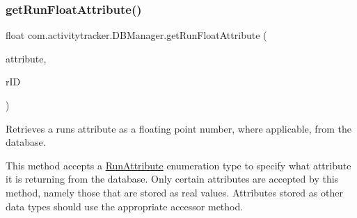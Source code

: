 \subsubsection{\texorpdfstring{get\+Run\+Float\+Attribute()}{getRunFloatAttribute()}}
{\footnotesize\ttfamily float com.\+activitytracker.\+D\+B\+Manager.\+get\+Run\+Float\+Attribute (\begin{DoxyParamCaption}\item[{final \mbox{\hyperlink{enumcom_1_1activitytracker_1_1_run_attribute}{Run\+Attribute}}}]{attribute,  }\item[{final int}]{r\+ID }\end{DoxyParamCaption})}

Retrieves a run\textquotesingle{}s attribute as a floating point number, where applicable, from the database.

This method accepts a \mbox{\hyperlink{enumcom_1_1activitytracker_1_1_run_attribute}{Run\+Attribute}} enumeration type to specify what attribute it is returning from the database. Only certain attributes are accepted by this method, namely those that are stored as real values. Attributes stored as other data types should use the appropriate accessor method.


